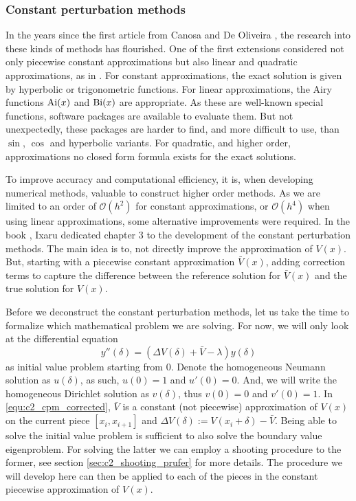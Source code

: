 \subsubsection{Constant perturbation methods}

In the years since the first article from Canosa and De Oliveira \cite{canosa_new_1970}, the research into these kinds of methods has flourished. One of the first extensions considered not only piecewise constant approximations but also linear and quadratic approximations, as in \cite{pruess_estimating_1973}. For constant approximations, the exact solution is given by hyperbolic or trigonometric functions. For linear approximations, the Airy functions $\operatorname{Ai}(x)$ and $\operatorname{Bi}(x)$ are appropriate. As these are well-known special functions, software packages are available to evaluate them. But not unexpectedly, these packages are harder to find, and more difficult to use, than $\sin$, $\cos$ and hyperbolic variants. For quadratic, and higher order, approximations no closed form formula exists for the exact solutions.

To improve accuracy and computational efficiency, it is, when developing numerical methods, valuable to construct higher order methods. As we are limited to an order of $\mathcal{O}(h^2)$ for constant approximations, or $\mathcal{O}(h^4)$ when using linear approximations, some alternative improvements were required. In the book \cite{ixaru_numerical_1984}, Ixaru dedicated chapter 3 to the development of the constant perturbation methods. The main idea is to, not directly improve the approximation of $V(x)$. But, starting with a piecewise constant approximation $\bar{V}(x)$, adding correction terms to capture the difference between the reference solution for $\bar{V}(x)$ and the true solution for $V(x)$.

Before we deconstruct the constant perturbation methods, let us take the time to formalize which mathematical problem we are solving. For now, we will only look at the differential equation
\begin{equation}\label{equ:c2_cpm_corrected}
    y''(\delta) = (\Delta V(\delta) + \bar{V} - \lambda) y(\delta)
\end{equation}
as initial value problem starting from $0$. Denote the homogeneous Neumann solution as $u(\delta)$, as such, $u(0) = 1$ and $u'(0) = 0$. And, we will write the homogeneous Dirichlet solution as $v(\delta)$, thus $v(0) = 0$ and $v'(0)=1$. In \eqref{equ:c2_cpm_corrected}, $\bar{V}$ is a constant (not piecewise) approximation of $V(x)$ on the current piece $[x_i, x_{i+1}]$ and $\Delta V(\delta) := V(x_i + \delta) - \bar{V}$. Being able to solve the initial value problem is sufficient to also solve the boundary value eigenproblem. For solving the latter we can employ a shooting procedure to the former, see section \ref{sec:c2_shooting_prufer} for more details. The procedure we will develop here can then be applied to each of the pieces in the constant piecewise approximation of $V(x)$.

